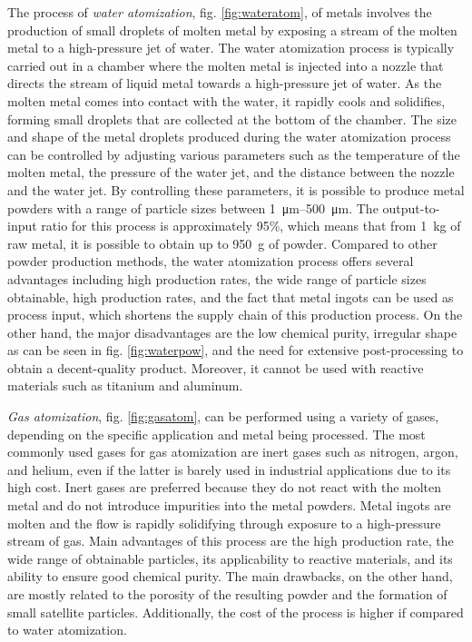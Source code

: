 The process of \emph{water atomization}, fig. \ref{fig:wateratom}, of metals involves the production of small droplets of molten metal by exposing a stream of the molten metal to a high-pressure jet of water. The water atomization process is typically carried out in a chamber where the molten metal is injected into a nozzle that directs the stream of liquid metal towards a high-pressure jet of water. As the molten metal comes into contact with the water, it rapidly cools and solidifies, forming small droplets that are collected at the bottom of the chamber. The size and shape of the metal droplets produced during the water atomization process can be controlled by adjusting various parameters such as the temperature of the molten metal, the pressure of the water jet, and the distance between the nozzle and the water jet. By controlling these parameters, it is possible to produce metal powders with a range of particle sizes between \SIrange[range-phrase = --]{1}{500}{\micro\metre}. The output-to-input ratio for this process is approximately 95\%, which means that from \SI{1}{\kilo\gram} of raw metal, it is possible to obtain up to \SI{950}{\gram} of powder. Compared to other powder production methods, the water atomization process offers several advantages including high production rates, the wide range of particle sizes obtainable, high production rates, and the fact that metal ingots can be used as process input, which shortens the supply chain of this production process. On the other hand, the major disadvantages are the low chemical purity, irregular shape as can be seen in fig. \ref{fig:waterpow}, and the need for extensive post-processing to obtain a decent-quality product. Moreover, it cannot be used with reactive materials such as titanium and aluminum.

\emph{Gas atomization}, fig. \ref{fig:gasatom}, can be performed using a variety of gases, depending on the specific application and metal being processed. The most commonly used gases for gas atomization are inert gases such as nitrogen, argon, and helium, even if the latter is barely used in industrial applications due to its high cost. Inert gases are preferred because they do not react with the molten metal and do not introduce impurities into the metal powders. Metal ingots are molten and the flow is rapidly solidifying through exposure to a high-pressure stream of gas. Main advantages of this process are the high production rate, the wide range of obtainable particles, its applicability to reactive materials, and its ability to ensure good chemical purity. The main drawbacks, on the other hand, are mostly related to the porosity of the resulting powder and the formation of small satellite particles. Additionally, the cost of the process is higher if compared to water atomization.

